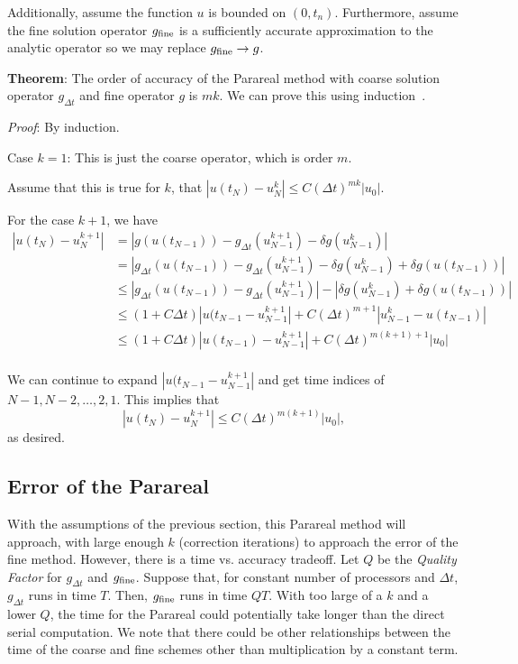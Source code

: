 \documentclass[letterpaper,12pt]{article}
\begin{document}
Additionally, assume the function $u$ is bounded on $(0, t_n)$. Furthermore,
assume the fine solution operator $g_{\textnormal{fine}}$ is a sufficiently
accurate approximation to the analytic operator so we may replace
$g_{\textnormal{fine}} \to g$. 

\textbf{Theorem}: The order of accuracy of the Parareal method with coarse
solution operator $g_{\Delta t}$ and fine operator $g$ is $mk$. We can prove
this using induction~\cite{bal2005convergence}. 

\emph{Proof}: By induction. 

Case $k = 1$: This is just the coarse operator, which is order $m$. 

Assume that this is true for $k$, that $|u(t_N) - u^k_N| \leq C(\Delta t)^{mk}
|u_0|$. 

For the case $k + 1$, we have
\[
\begin{aligned}
    |u(t_N) - u^{k+1}_N| &= 
    |g(u(t_{N-1})) - g_{\Delta t}(u^{k+1}_{N-1}) - \delta g(u^k_{N-1})| \\
    &= |g_{\Delta t}(u(t_{N-1})) - g_{\Delta t}(u^{k+1}_{N-1}) - \delta
    g(u^k_{N-1}) + \delta g(u(t_{N-1}))| \\
    &\leq |g_{\Delta t}(u(t_{N-1})) - g_{\Delta t}(u^{k+1}_{N-1})| - |\delta
    g(u^k_{N-1}) + \delta g(u(t_{N-1}))| \\
    &\leq (1 + C \Delta t) |u(t_{N-1} - u_{N-1}^{k+1}| + C(\Delta t)^{m+1} |
    u_{N-1}^k - u(t_{N-1}) | \\
    &\leq (1 + C \Delta t) |u(t_{N-1}) - u_{N-1}^{k+1}| + C(\Delta t)^{m(k+1)+1}
    | u_0 | \\
\end{aligned}
\]

We can continue to expand $|u(t_{N-1} - u_{N-1}^{k+1}|$ and get time indices of
$N-1, N-2, \ldots, 2, 1$. This implies that 
\[ |u(t_N) - u^{k+1}_N| \leq C(\Delta t)^{m(k+1)} |u_0|, \]
as desired. 

\subsection{Error of the Parareal}

With the assumptions of the previous section, this Parareal method will
approach, with large enough $k$ (correction iterations) to approach the error of
the fine method. However, there is a time vs. accuracy tradeoff. Let $Q$ be the
\emph{Quality Factor} for $g_{\Delta t}$ and $g_{\textnormal{fine}}$. Suppose
that, for constant number of processors and $\Delta t$, $g_{\Delta t}$ runs in
time $T$. Then, $g_{\textnormal{fine}}$ runs in time $QT$. With too large of a
$k$ and a lower $Q$, the time for the Parareal could potentially take longer
than the direct serial computation. We note that there could be other
relationships between the time of the coarse and fine schemes other than
multiplication by a constant term. 
\end{document}
